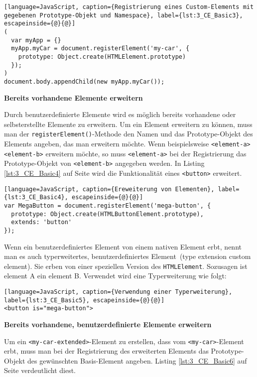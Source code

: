 \begin{lstlisting}[language=JavaScript, caption={Registrierung eines Custom-Elements mit gegebenen Prototype-Objekt und Namespace}, label={lst:3_CE_Basic3}, escapeinside={@}{@}]
(
  var myApp = {}
  myApp.myCar = document.registerElement('my-car', {
    prototype: Object.create(HTMLElement.prototype)
  });
)
document.body.appendChild(new myApp.myCar());
\end{lstlisting}

\textbf{Bereits vorhandene Elemente erweitern}

Durch benutzerdefinierte Elemente wird es möglich bereits vorhandene oder selbsterstellte Elemente zu erweitern. Um ein Element erweitern zu können, muss man der \lstinline|registerElement()|-Methode den Namen und das Prototype-Objekt des Elements angeben, das man erweitern möchte. Wenn beispielsweise \lstinline|<element-a>| \lstinline|<element-b>| erweitern möchte, so muss \lstinline|<element-a>| bei der Registrierung das Prototype-Objekt von \lstinline|<element-b>| angegeben werden. In Listing \ref{lst:3_CE_Basic4} auf Seite \pageref{lst:3_CE_Basic4} wird die Funktionalität eines \lstinline|<button>| erweitert.

\begin{lstlisting}[language=JavaScript, caption={Ereweiterung von Elementen}, label={lst:3_CE_Basic4}, escapeinside={@}{@}]
var MegaButton = document.registerElement('mega-button', {
  prototype: Object.create(HTMLButtonElement.prototype),
  extends: 'button'
});
\end{lstlisting}

Wenn ein benutzerdefiniertes Element von einem nativen Element erbt, nennt man es auch \glqq typerweitertes, benutzerdefiniertes Element\grqq\ (type extension custom element). Sie erben von einer speziellen Version des \lstinline|HTMLElement|. Sozusagen \glqq ist element A ein element B\grqq . Verwendet wird eine Typerweiterung wie folgt:

\begin{lstlisting}[language=JavaScript, caption={Verwendung einer Typerweiterung}, label={lst:3_CE_Basic5}, escapeinside={@}{@}]
<button is="mega-button">
\end{lstlisting}

\textbf{Bereits vorhandene, benutzerdefinierte Elemente erweitern}

Um ein \lstinline|<my-car-extended>|-Element zu erstellen, dass vom \lstinline|<my-car>|-Element erbt, muss man bei der Registrierung des erweiterten Elements das Prototype-Objekt des gewünschten \glqq Basis\grqq -Element angeben. Listing \ref{lst:3_CE_Basic6} auf Seite \pageref{lst:3_CE_Basic6} verdeutlicht diest.

